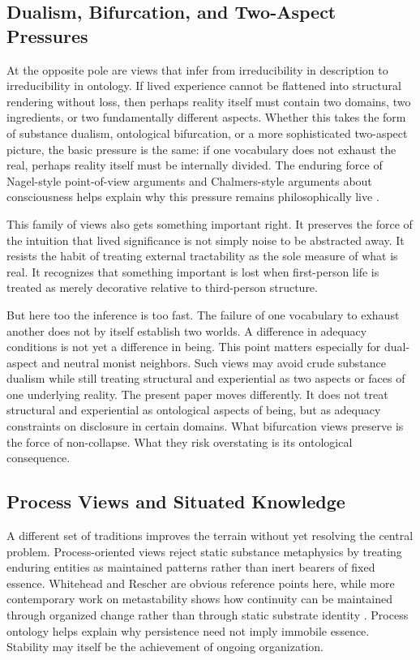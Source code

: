 \documentclass[11pt]{article}
\begin{document}
\subsection{Dualism, Bifurcation, and Two-Aspect Pressures}

At the opposite pole are views that infer from irreducibility in description to irreducibility in ontology. If lived experience cannot be flattened into structural rendering without loss, then perhaps reality itself must contain two domains, two ingredients, or two fundamentally different aspects. Whether this takes the form of substance dualism, ontological bifurcation, or a more sophisticated two-aspect picture, the basic pressure is the same: if one vocabulary does not exhaust the real, perhaps reality itself must be internally divided. The enduring force of Nagel-style point-of-view arguments and Chalmers-style arguments about consciousness helps explain why this pressure remains philosophically live \cite{Nagel1974,Chalmers1995}.

This family of views also gets something important right. It preserves the force of the intuition that lived significance is not simply noise to be abstracted away. It resists the habit of treating external tractability as the sole measure of what is real. It recognizes that something important is lost when first-person life is treated as merely decorative relative to third-person structure.

But here too the inference is too fast. The failure of one vocabulary to exhaust another does not by itself establish two worlds. A difference in adequacy conditions is not yet a difference in being. This point matters especially for dual-aspect and neutral monist neighbors. Such views may avoid crude substance dualism while still treating structural and experiential as two aspects or faces of one underlying reality. The present paper moves differently. It does not treat structural and experiential as ontological aspects of being, but as adequacy constraints on disclosure in certain domains. What bifurcation views preserve is the force of non-collapse. What they risk overstating is its ontological consequence.

\subsection{Process Views and Situated Knowledge}

A different set of traditions improves the terrain without yet resolving the central problem. Process-oriented views reject static substance metaphysics by treating enduring entities as maintained patterns rather than inert bearers of fixed essence. Whitehead and Rescher are obvious reference points here, while more contemporary work on metastability shows how continuity can be maintained through organized change rather than through static substrate identity \cite{Whitehead1978,Rescher1996,TognoliKelso2014}. Process ontology helps explain why persistence need not imply immobile essence. Stability may itself be the achievement of ongoing organization.
\end{document}
